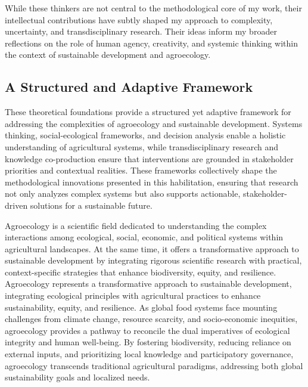 \documentclass[
]{article}
\begin{document}
While these thinkers are not central to the methodological core of my
work, their intellectual contributions have subtly shaped my approach to
complexity, uncertainty, and transdisciplinary research. Their ideas
inform my broader reflections on the role of human agency, creativity,
and systemic thinking within the context of sustainable development and
agroecology.

\hypertarget{a-structured-and-adaptive-framework}{%
\subsection*{A Structured and Adaptive
Framework}\label{a-structured-and-adaptive-framework}}

These theoretical foundations provide a structured yet adaptive
framework for addressing the complexities of agroecology and sustainable
development. Systems thinking, social-ecological frameworks, and
decision analysis enable a holistic understanding of agricultural
systems, while transdisciplinary research and knowledge co-production
ensure that interventions are grounded in stakeholder priorities and
contextual realities. These frameworks collectively shape the
methodological innovations presented in this habilitation, ensuring that
research not only analyzes complex systems but also supports actionable,
stakeholder-driven solutions for a sustainable future.

Agroecology is a scientific field dedicated to understanding the complex
interactions among ecological, social, economic, and political systems
within agricultural landscapes. At the same time, it offers a
transformative approach to sustainable development by integrating
rigorous scientific research with practical, context-specific strategies
that enhance biodiversity, equity, and resilience. Agroecology
represents a transformative approach to sustainable development,
integrating ecological principles with agricultural practices to enhance
sustainability, equity, and resilience. As global food systems face
mounting challenges from climate change, resource scarcity, and
socio-economic inequities, agroecology provides a pathway to reconcile
the dual imperatives of ecological integrity and human well-being. By
fostering biodiversity, reducing reliance on external inputs, and
prioritizing local knowledge and participatory governance, agroecology
transcends traditional agricultural paradigms, addressing both global
sustainability goals and localized needs.
\end{document}
